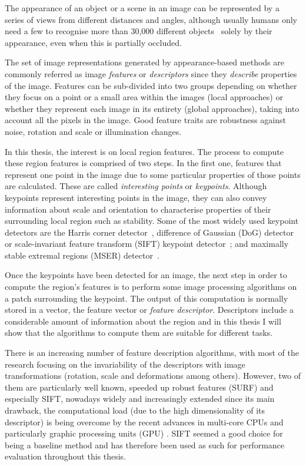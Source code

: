 The appearance of an object or a scene in an image can be represented by a series of views from different distances and angles, although usually humans only need a few to recognise more than 30,000 different objects~\cite{biederman1987recognition} solely by their appearance, even when this is partially occluded. 

The set of image representations generated by appearance-based methods are commonly referred as image \textit{features} or \textit{descriptors} since they \textit{describe} properties of the image. Features can be sub-divided into two groups depending on whether they focus on a point or a small area within the images (local approaches) or whether they represent each image in its entirety (global approaches), taking into account all the pixels in the image. Good feature traits are robustness against noise, rotation and scale or illumination changes. 

In this thesis, the interest is on local region features. The process to compute these region features is comprised of two steps. In the first one, features that represent one point in the image due to some particular properties of those points are calculated. These are called \textit{interesting points} or \textit{keypoints}. Although keypoints represent interesting points in the image, they can also convey information about scale and orientation to characterise properties of their surrounding local region such as stability. Some of the most widely used keypoint detectors are the Harris corner detector~\cite{harris1988combined}, difference of Gaussian (DoG) detector or scale-invariant feature transform (SIFT) keypoint detector~\cite{lowe2004distinctive}; and maximally stable extremal regions (MSER) detector~\cite{matas2004robust}.

Once the keypoints have been detected for an image, the next step in order to compute the region's features is to perform some image processing algorithms on a patch surrounding the keypoint. The output of this computation is normally stored in a vector, the feature vector or \textit{feature descriptor}. Descriptors include a considerable amount of information about the region and in this thesis I will show that the algorithms to compute them are suitable for different tasks.

There is an increasing number of feature description algorithms, with most of the research focusing on the invariability of the descriptors with image transformations (rotation, scale and deformations among others). However, two of them are particularly well known, speeded up robust features (SURF) and especially SIFT, nowadays widely and increasingly extended since its main drawback, the computational load (due to the high dimensionality of its descriptor) is being overcome by the recent advances in multi-core CPUs and particularly graphic processing units (GPU) \cite{Wu2007}. SIFT seemed a good choice for being a baseline method and has therefore been used as such for performance evaluation throughout this thesis.

